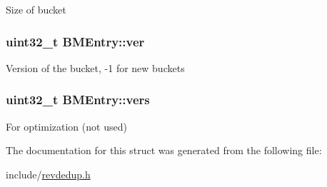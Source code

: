 \-Size of bucket \hypertarget{structBMEntry_aa83f08bc3da9de006644e89a3eeb28e8}{
\subsubsection[{ver}]{\setlength{\rightskip}{0pt plus 5cm}uint32\-\_\-t {\bf \-B\-M\-Entry\-::ver}}}\label{structBMEntry_aa83f08bc3da9de006644e89a3eeb28e8}
\-Version of the bucket, -\/1 for new buckets \hypertarget{structBMEntry_ae536aed7cbf92693d391fa7ab5c6c073}{
\subsubsection[{vers}]{\setlength{\rightskip}{0pt plus 5cm}uint32\-\_\-t {\bf \-B\-M\-Entry\-::vers}}}\label{structBMEntry_ae536aed7cbf92693d391fa7ab5c6c073}
\-For optimization (not used) 

\-The documentation for this struct was generated from the following file\-:\begin{DoxyCompactItemize}
\item 
include/\hyperlink{revdedup_8h}{revdedup.\-h}\end{DoxyCompactItemize}
